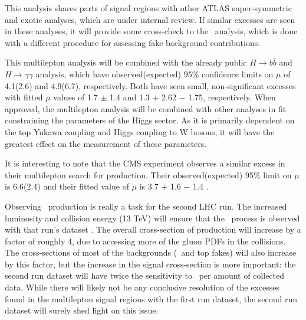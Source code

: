 This analysis shares parts of signal regions with other ATLAS super-symmetric
and exotic analyses, which are under internal review. If similar excesses are seen in these analyses,
it will provide some cross-check to the \tth\ analysis, which is done with a
different procedure for assessing fake background contributions.

This multilepton analysis will be combined with the already public $H\rightarrow b\bar{b}$ \cite{Aad:2014lma} and
$H\rightarrow\gamma\gamma$\cite{ATLAS-CONF-2014-011} analysis, which have observed(expected) 95\%
confidence limits on $\mu$ of 4.1(2.6) and 4.9(6.7), respectively. Both have seen small, non-significant excesses 
with fitted $\mu$ values of 1.7 $\pm$ 1.4 and 1.3 $+$ 2.62 $-$ 1.75, respectively. When approved,
the multilepton analysis will be combined with other analyses in fit constraining the parameters of the Higgs sector.
As it is primarily dependent on the top Yukawa coupling and Higgs coupling to W bosons, it will
have the greatest effect on the measurement of these parameters.

It is interesting to note that the CMS experiment observes a similar excess in their multilepton search
for \tth production. Their observed(expected) 95\% limit on $\mu$ is 6.6(2.4) and their fitted value of $\mu$
is 3.7 $+$ 1.6 $-$ 1.4 \cite{CMS-PAS-HIG-13-020}.

Observing \tth\ production is really a task for the second LHC run. The increased luminosity and collision
energy (13 TeV) will ensure that the \tth\ process is observed with that run's dataset \cite{Dawson:2013bba}. The
overall cross-section of \tth production will increase by a factor of roughly 4, due to accessing
more of the gluon PDFs in the collisions. The cross-sections of most of the backgrounds (\ttV\ and top fakes) will also increase by this factor,
but the increase in the signal cross-section is more important: the second run dataset will have
twice the sensitivity to \tth\ per amount of collected data. While
there will likely not be any conclusive resolution of the excesses found in the multilepton signal regions
with the first run dataset, the second run dataset will surely shed light on this issue.  

